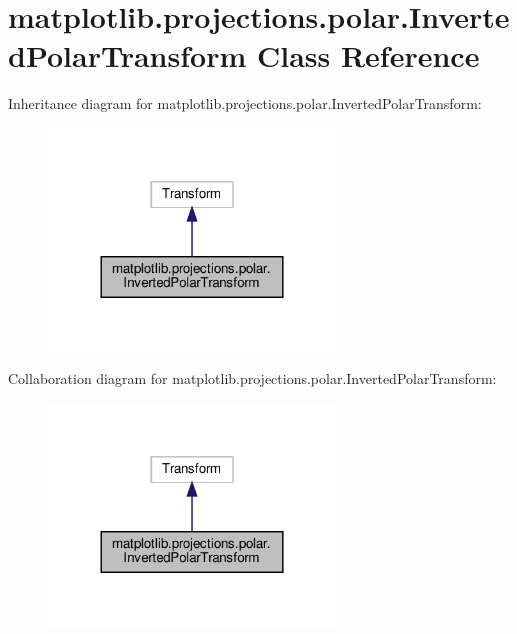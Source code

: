 \hypertarget{classmatplotlib_1_1projections_1_1polar_1_1InvertedPolarTransform}{}\section{matplotlib.\+projections.\+polar.\+Inverted\+Polar\+Transform Class Reference}
\label{classmatplotlib_1_1projections_1_1polar_1_1InvertedPolarTransform}


Inheritance diagram for matplotlib.\+projections.\+polar.\+Inverted\+Polar\+Transform\+:
\nopagebreak
\begin{figure}[H]
\begin{center}
\leavevmode
\includegraphics[width=216pt]{classmatplotlib_1_1projections_1_1polar_1_1InvertedPolarTransform__inherit__graph}
\end{center}
\end{figure}


Collaboration diagram for matplotlib.\+projections.\+polar.\+Inverted\+Polar\+Transform\+:
\nopagebreak
\begin{figure}[H]
\begin{center}
\leavevmode
\includegraphics[width=216pt]{classmatplotlib_1_1projections_1_1polar_1_1InvertedPolarTransform__coll__graph}
\end{center}
\end{figure}
